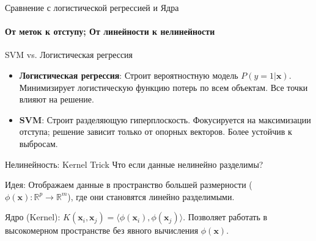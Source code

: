 \documentclass[notheorems, handout]{beamer}
\begin{document}
\begin{frame}{Сравнение с логистической регрессией и Ядра}
	\framesubtitle{От меток к отступу; От линейности к нелинейности}

	\begin{block}{SVM vs. Логистическая регрессия}
		\begin{itemize}
			\item \textbf{Логистическая регрессия}: Строит \alert{вероятностную} модель $P(y=1|\mathbf{x})$. Минимизирует \alert{логистическую функцию потерь} по всем объектам. Все точки влияют на решение.
			\item \textbf{SVM}: Строит \alert{разделяющую гиперплоскость}. Фокусируется на \alert{максимизации отступа}; решение зависит только от \alert{опорных векторов}. Более устойчив к выбросам.
		\end{itemize}
	\end{block}

	\begin{block}{Нелинейность: Kernel Trick}
		Что если данные нелинейно разделимы?

		Идея: Отображаем данные в пространство \alert{большей размерности} ($\phi(\mathbf{x}): \mathbb{R}^p \rightarrow \mathbb{R}^m$), где они становятся линейно разделимыми.

		\alert{Ядро (Kernel)}: $K(\mathbf{x}_i, \mathbf{x}_j) = \langle \phi(\mathbf{x}_i), \phi(\mathbf{x}_j) \rangle$. Позволяет работать в высокомерном пространстве \alert{без явного вычисления} $\phi(\mathbf{x})$.
	\end{block}
\end{frame}
\end{document}
